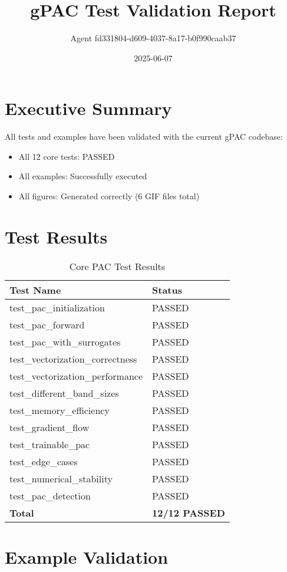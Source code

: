 \documentclass[11pt,a4paper]{article}
\title{gPAC Test Validation Report}
\author{Agent fd331804-d609-4037-8a17-b0f990caab37}
\date{2025-06-07}
\begin{document}
\maketitle

\section{Executive Summary}

All tests and examples have been validated with the current gPAC codebase:
\begin{itemize}
\item All 12 core tests: PASSED
\item All examples: Successfully executed  
\item All figures: Generated correctly (6 GIF files total)
\end{itemize}

\section{Test Results}

\begin{table}[H]
\centering
\small
\begin{tabular}{ll}
\toprule
\textbf{Test Name} & \textbf{Status} \\
\midrule
test\_pac\_initialization & PASSED \\
test\_pac\_forward & PASSED \\
test\_pac\_with\_surrogates & PASSED \\
test\_vectorization\_correctness & PASSED \\
test\_vectorization\_performance & PASSED \\
test\_different\_band\_sizes & PASSED \\
test\_memory\_efficiency & PASSED \\
test\_gradient\_flow & PASSED \\
test\_trainable\_pac & PASSED \\
test\_edge\_cases & PASSED \\
test\_numerical\_stability & PASSED \\
test\_pac\_detection & PASSED \\
\midrule
\textbf{Total} & \textbf{12/12 PASSED} \\
\bottomrule
\end{tabular}
\caption{Core PAC Test Results}
\end{table}

\section{Example Validation}
\end{document}
